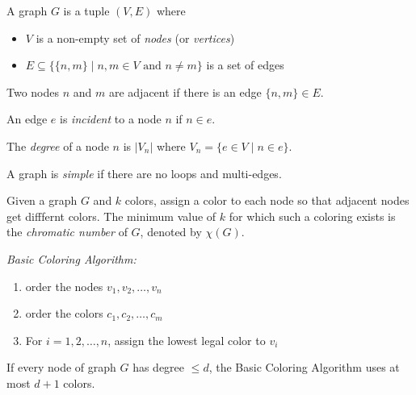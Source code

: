 \documentclass[11pt]{article}
\begin{document}
\begin{definition}
A graph $G$ is a tuple $(V, E)$ where
\begin{itemize}
\item $V$ is a non-empty set of \emph{nodes} (or \emph{vertices})
\item $E \subseteq \{\{n,m\} \mid n,m \in V \text{ and } n \neq m\}$ is a set of edges
\end{itemize}
\end{definition}

\begin{definition}
Two nodes $n$ and $m$ are adjacent if there is an edge $\{n,m\} \in E$.
\end{definition}

\begin{definition}
An edge $e$ is \emph{incident} to a node $n$ if $n \in e$.
\end{definition}

\begin{definition}
The \emph{degree} of a node $n$ is $|V_n|$ where $V_n = \{e \in V \mid n \in e \}$.
\end{definition}

\begin{definition}
A graph is \emph{simple} if there are no loops and multi-edges.
\end{definition}

\begin{definition}
Given a graph $G$ and $k$ colors, assign a color to each node so that adjacent nodes get difffernt
colors. The minimum value of $k$ for which such a coloring exists is the \emph{chromatic number} of
$G$, denoted by $\chi(G)$.
\end{definition}

\begin{definition}
\emph{Basic Coloring Algorithm:}
\begin{enumerate}
\item order the nodes $v_1,v_2,\dots,v_n$
\item order the colors $c_1,c_2,\dots,c_m$
\item For $i=1,2,\dots,n$, assign the lowest legal color to $v_i$
\end{enumerate}
\end{definition}

\begin{theorem}
If every node of graph $G$ has degree $\leq d$, the Basic Coloring Algorithm uses at most $d+1$
colors.
\end{theorem}
\end{document}
